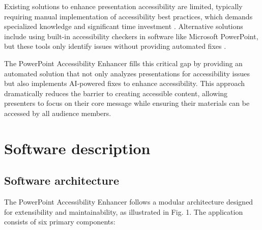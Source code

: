 \documentclass[preprint,review,12pt]{elsarticle} %
\begin{document}
Existing solutions to enhance presentation accessibility are limited, typically requiring manual implementation of accessibility best practices, which demands specialized knowledge and significant time investment \cite{accessibility-barriers}. Alternative solutions include using built-in accessibility checkers in software like Microsoft PowerPoint, but these tools only identify issues without providing automated fixes \cite{ms-accessibility}. 

The PowerPoint Accessibility Enhancer fills this critical gap by providing an automated solution that not only analyzes presentations for accessibility issues but also implements AI-powered fixes to enhance accessibility. This approach dramatically reduces the barrier to creating accessible content, allowing presenters to focus on their core message while ensuring their materials can be accessed by all audience members.

\section{Software description}
\subsection{Software architecture}
The PowerPoint Accessibility Enhancer follows a modular architecture designed for extensibility and maintainability, as illustrated in Fig. 1. The application consists of six primary components:
\end{document}
